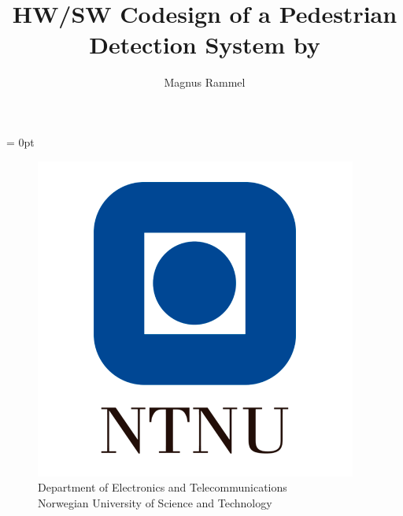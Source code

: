 
\footskip = 0pt


\title{\textbf{\Huge{HW/SW Codesign of a Pedestrian Detection System}} \newline \newline
by}
\author{\Large Magnus Rammel}


\begin{figure}[b]
    \begin{center}
        \includegraphics[scale=0.32]{Attachments/NTNU.png}
        \caption{Department of Electronics and Telecommunications \\
        Norwegian University of Science and Technology}
        \label{AGCdiag}
    \end{center}
\end{figure}
\maketitle

\clearpage